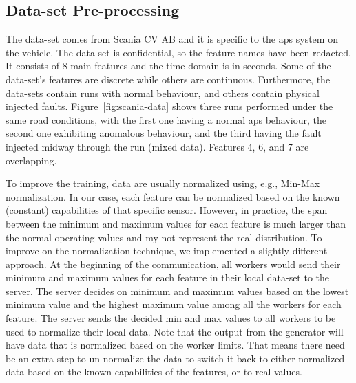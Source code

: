 




\subsection{Data-set Pre-processing}
\label{sec:data-pre-process}
%
 The data-set comes from Scania CV AB and it is specific to the \gls*{aps} system on the vehicle. The data-set is confidential, so the feature names have been redacted. It consists of 8 main features and the time domain is in seconds. Some of the data-set's features are discrete while others are continuous. Furthermore, the data-sets contain runs with normal behaviour, and others contain physical injected faults.
%
Figure~\ref{fig:scania-data} shows three runs performed under the same road conditions, with the first one having a normal \gls*{aps} behaviour, the second one exhibiting anomalous behaviour, and the third having the fault injected midway through the run (mixed data). Features 4, 6, and 7 are overlapping.



To improve the training, data are usually normalized using, e.g., Min-Max normalization. In our case, each feature can be normalized based on the known (constant) capabilities of that specific sensor. %
However, in practice, the span between the minimum and maximum values for each feature is much larger than the normal operating values and my not represent the real distribution.
%
To improve on the normalization technique, we implemented a slightly different approach. %
At the beginning of the communication, all workers would send their minimum and maximum values for each feature in their local data-set to the server. The server decides on minimum and maximum values based on the lowest minimum value and the highest maximum value among all the workers for each feature. The server sends the decided min and max values to all workers to be used to normalize their local data. Note that the output from the generator will have data that is normalized based on the worker limits. That means there need be an extra step to un-normalize the data to switch it back to either normalized data based on the known capabilities of the features, or to real values.
% 

